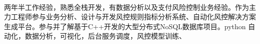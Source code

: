 \documentclass[11pt, a4paper, UTF8]{awesome-cv}
\begin{document}
\makecvheader[R]

\makecvfooter
  {\ }
  {\ }
  {\thepage}




\begin{cvparagraph}
两年半工作经验，熟悉全栈开发，有数据分析以及支付风险控制业务经验。作为主力工程师参与业务分析、设计与开发风控规则指标分析系统、自动化风控解决方案生成平台。参与并了解基于C++开发的大型分布式NoSQL数据库项目。python 自动化，数据分析，可视化，后台服务调度，风控模型训练、
\end{cvparagraph}
\end{document}
